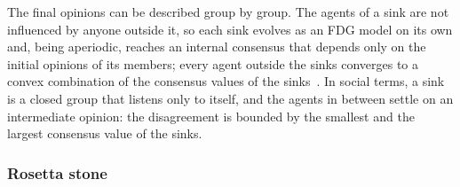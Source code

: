 The final opinions can be described group by group. The agents of a sink are not
influenced by anyone outside it, so each sink evolves as an FDG model on its own and,
being aperiodic, reaches an internal consensus that depends only on the initial
opinions of its members; every agent outside the sinks converges to a convex
combination of the consensus values of the sinks~\cite{baggio_dt}. In social terms, a
sink is a closed group that listens only to itself, and the agents in between settle
on an intermediate opinion: the disagreement is bounded by the smallest and the largest
consensus value of the sinks.
%


\subsubsection{Rosetta stone}
\label{subsubsec:rosetta}

